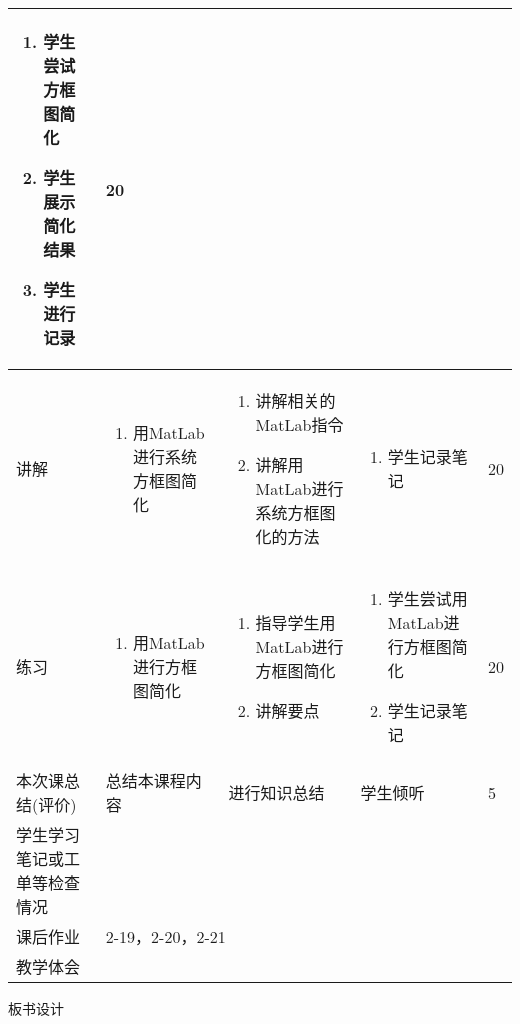 {\begin{landscape}
\begin{longtable}{|m{10mm}|m{50mm}|m{50mm}|m{50mm}|m{15mm}|}
\begin{enumerate}
\item 学生尝试方框图简化
\item 学生展示简化结果
\item 学生进行记录
\end{enumerate} &20 \\\hline
讲解&\begin{enumerate}
\item 用MatLab进行系统方框图简化
\end{enumerate}
 &\begin{enumerate}
\item 讲解相关的MatLab指令
\item 讲解用MatLab进行系统方框图化的方法
\end{enumerate} &\begin{enumerate}
\item 学生记录笔记
\end{enumerate} &20 \\\hline
练习&
\begin{enumerate}
\item 用MatLab进行方框图简化
\end{enumerate}
 &\begin{enumerate}
\item 指导学生用MatLab进行方框图简化
\item 讲解要点
\end{enumerate} &\begin{enumerate}
\item 学生尝试用MatLab进行方框图简化
\item 学生记录笔记
\end{enumerate} &20 \\\hline
\centering 本次课总结(评价)&总结本课程内容 &进行知识总结 &学生倾听 &5 \\\hline
\centering 学生学习笔记或工单等检查情况&\multicolumn{4}{m{165mm}|}{\quad}\\\hline
\centering 课后作业&\multicolumn{4}{m{165mm}|}{2-19，2-20，2-21}\\\hline
\centering 教学体会&\multicolumn{4}{m{165mm}|}{\quad}\\
\end{longtable}

\end{landscape}
\clearpage
\begin{center}
{\huge 板书设计}
\end{center}
}
